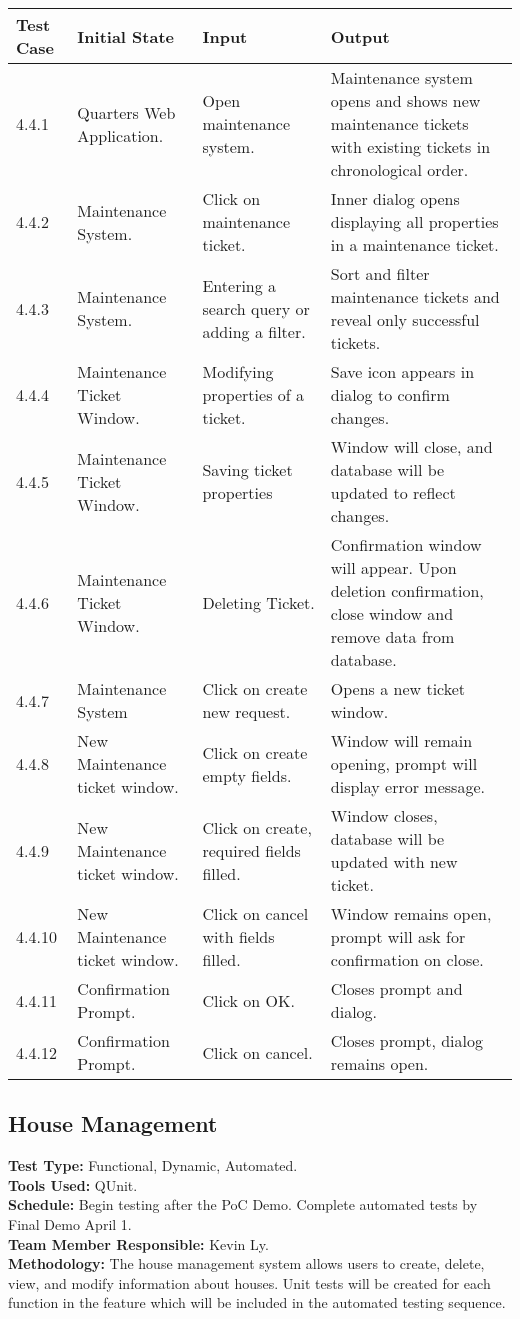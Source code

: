 \documentclass[12pt]{article}
\begin{document}
\begin{longtable}{|p{2cm}|p{3cm}|p{5cm}|p{5cm}|}
\hline
\textbf{Test Case}  & \textbf{Initial State} & \textbf{Input} & \textbf{Output} \\ \hline
4.4.1 & Quarters Web Application. & Open maintenance system. & Maintenance system opens and shows new maintenance tickets with existing tickets in chronological order. \\ 
\hline
4.4.2 & Maintenance System. & Click on maintenance ticket. & Inner dialog opens displaying all properties in a maintenance ticket. \\
\hline
4.4.3 & Maintenance System. & Entering a search query or adding a filter. & Sort and filter maintenance tickets and reveal only successful tickets. \\
\hline
4.4.4 & Maintenance Ticket Window. & Modifying properties of a ticket. & Save icon appears in dialog to confirm changes.\\
\hline
4.4.5 & Maintenance Ticket Window. & Saving ticket properties & Window will close, and database will be updated to reflect changes.\\
\hline
4.4.6 & Maintenance Ticket Window. & Deleting Ticket. & Confirmation window will appear. Upon deletion confirmation, close window and remove data from database.\\
\hline
4.4.7 & Maintenance System & Click on create new request. & Opens a new ticket window.\\
\hline
4.4.8 & New Maintenance ticket window. & Click on create empty fields. & Window will remain opening, prompt will display error message.\\
\hline
4.4.9 & New Maintenance ticket window. & Click on create, required fields filled. & Window closes, database will be updated with new ticket.\\
\hline
4.4.10 & New Maintenance ticket window. & Click on cancel with fields filled. & Window remains open, prompt will ask for confirmation on close.\\
\hline
4.4.11 & Confirmation Prompt. & Click on OK. & Closes prompt and dialog. \\
\hline
4.4.12 & Confirmation Prompt. & Click on cancel. & Closes prompt, dialog remains open.\\
\hline
\end{longtable}

\subsection{House Management}
\textbf{Test Type:} Functional, Dynamic, Automated. \\
\textbf{Tools Used:} QUnit. \\
\textbf{Schedule:} Begin testing after the PoC Demo. Complete automated tests by Final Demo April 1. \\
\textbf{Team Member Responsible:} Kevin Ly.\\
\textbf{Methodology:} The house management system allows users to create, delete, view, and modify information about houses. Unit tests will be created for each function in the feature which will be included in the automated testing sequence.
\end{document}
